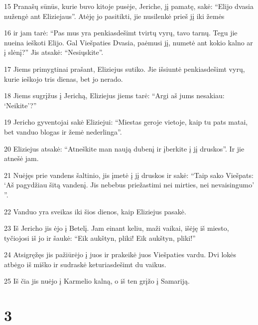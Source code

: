 \par 15 Pranašų sūnūs, kurie buvo kitoje pusėje, Jeriche, jį pamatę, sakė: “Elijo dvasia nužengė ant Eliziejaus”. Atėję jo pasitikti, jie nusilenkė prieš jį iki žemės 
\par 16 ir jam tarė: “Pas mus yra penkiasdešimt tvirtų vyrų, tavo tarnų. Tegu jie nueina ieškoti Elijo. Gal Viešpaties Dvasia, paėmusi jį, numetė ant kokio kalno ar į slėnį?” Jis atsakė: “Nesiųskite”. 
\par 17 Jiems primygtinai prašant, Eliziejus sutiko. Jie išsiuntė penkiasdešimt vyrų, kurie ieškojo tris dienas, bet jo nerado. 
\par 18 Jiems sugrįžus į Jerichą, Eliziejus jiems tarė: “Argi aš jums nesakiau: ‘Neikite’?” 
\par 19 Jericho gyventojai sakė Eliziejui: “Miestas geroje vietoje, kaip tu pats matai, bet vanduo blogas ir žemė nederlinga”. 
\par 20 Eliziejus atsakė: “Atneškite man naują dubenį ir įberkite į jį druskos”. Ir jie atnešė jam. 
\par 21 Nuėjęs prie vandens šaltinio, jis įmetė į jį druskos ir sakė: “Taip sako Viešpats: ‘Aš pagydžiau šitą vandenį. Jis nebebus priežastimi nei mirties, nei nevaisingumo’ ”. 
\par 22 Vanduo yra sveikas iki šios dienos, kaip Eliziejus pasakė. 
\par 23 Iš Jericho jis ėjo į Betelį. Jam einant keliu, maži vaikai, išėję iš miesto, tyčiojosi iš jo ir šaukė: “Eik aukštyn, pliki! Eik aukštyn, pliki!” 
\par 24 Atsigręžęs jis pažiūrėjo į juos ir prakeikė juos Viešpaties vardu. Dvi lokės atbėgo iš miško ir sudraskė keturiasdešimt du vaikus. 
\par 25 Iš čia jis nuėjo į Karmelio kalną, o iš ten grįžo į Samariją.



\chapter{3}

